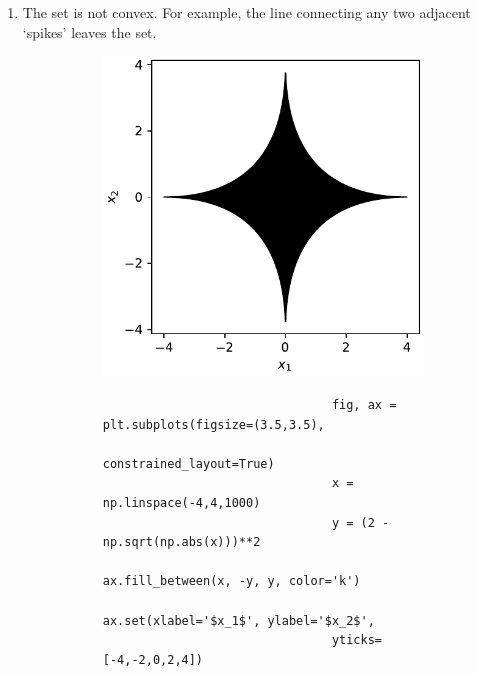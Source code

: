 \documentclass{article}
\begin{document}
\begin{enumerate}
        \item The set is not convex.
        For example, the line connecting any two adjacent `spikes' leaves the set.
        \begin{figure}[H]
                \begin{subfigure}{0.5\linewidth}
                        \centering
                        \includegraphics[width=\linewidth]{code/B2c.pdf}
                \end{subfigure}
                \hfill
                \begin{subfigure}{0.40\linewidth}
                        \centering
                        \begin{verbatim}
                                fig, ax = plt.subplots(figsize=(3.5,3.5), 
                                                constrained_layout=True)
                                x = np.linspace(-4,4,1000)
                                y = (2 - np.sqrt(np.abs(x)))**2
                                ax.fill_between(x, -y, y, color='k')
                                ax.set(xlabel='$x_1$', ylabel='$x_2$',
                                yticks=[-4,-2,0,2,4])
                        \end{verbatim}
                \end{subfigure}
        \end{figure}
\end{enumerate}
\end{document}
